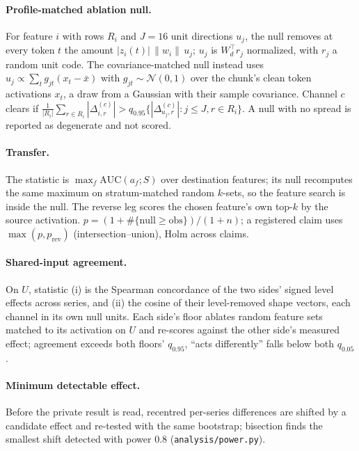 \paragraph{Profile-matched ablation null.} For feature $i$ with rows $R_i$ and $J=16$ unit directions $u_j$, the null
removes at every token $t$ the amount $|z_i(t)|\,\|w_i\|\,u_j$; $u_j$ is $W_d^{\top}r_j$ normalized, with $r_j$ a random unit code. The covariance-matched null instead uses
$u_j\propto\sum_t g_{jt}(x_t-\bar x)$ with $g_{jt}\sim\mathcal{N}(0,1)$ over the chunk's clean token activations $x_t$,
a draw from a Gaussian with their sample covariance. Channel $c$ clears if
$\frac{1}{|R_i|}\sum_{r\in R_i}|\Delta^{(c)}_{i,r}| > q_{0.95}\{|\Delta^{(c)}_{u_j,r}|: j\le J, r\in R_i\}$. A null
with no spread is reported as degenerate and not scored.

\paragraph{Transfer.} The statistic is $\max_f \mathrm{AUC}(a_f;S)$ over destination features; its null
recomputes the same maximum on stratum-matched random $k$-sets, so the feature search is inside the null. The
reverse leg scores the chosen feature's own top-$k$ by the source activation. $p=(1+\#\{\text{null}\ge
\text{obs}\})/(1+n)$; a registered claim uses $\max(p,p_{\text{rev}})$ (intersection--union), Holm across claims.

\paragraph{Shared-input agreement.} On $U$, statistic (i) is the Spearman concordance of the two sides' signed
level effects across series, and (ii) the cosine of their level-removed shape vectors, each channel in its own
null units. Each side's floor ablates random feature sets matched to its activation on $U$ and re-scores against
the other side's measured effect; agreement exceeds both floors' $q_{0.95}$, ``acts differently'' falls below
both $q_{0.05}$.

\paragraph{Minimum detectable effect.} Before the private result is read, recentred per-series differences are
shifted by a candidate effect and re-tested with the same bootstrap; bisection finds the smallest shift detected
with power 0.8 (\texttt{analysis/power.py}).

